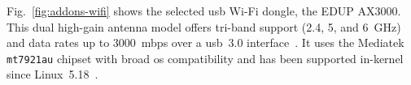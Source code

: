 Fig.~\ref{fig:addons-wifi} shows the selected \gls{usb} Wi-Fi dongle, the EDUP
AX3000. This dual high-gain antenna model offers tri-band support (2.4, 5, and
6~GHz) and data rates up to 3000~\gls{mbps} over a \gls{usb}~3.0 interface~\cite{ax3000-specs}. It uses the Mediatek \lstinline{mt7921au} chipset
with broad \gls{os} compatibility and has been supported in-kernel since
Linux~5.18~\cite{ax3000-linux}.


